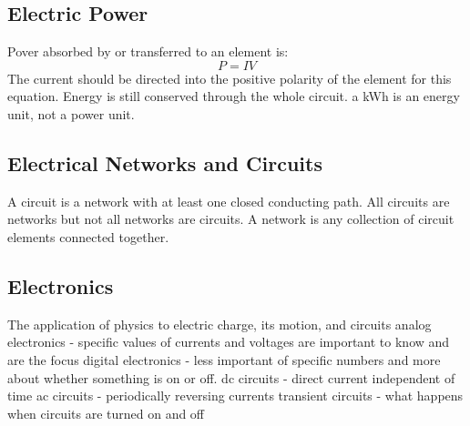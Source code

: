 \documentclass[twocolumn]{article}
\begin{document}
\subsection{Electric Power}
\begin{outline}
	\1 Pover absorbed by or transferred to an element is: \[P=IV\] The current should be directed into the positive polarity of the element for this equation. 
	\1 Energy is still conserved through the whole circuit. 
	\1 a kWh is an energy unit, not a power unit. 
\end{outline}
\subsection{Electrical Networks and Circuits}
\begin{outline}
	\1 A circuit is a network with at least one closed conducting path. 
	\1 All circuits are networks but not all networks are circuits. 
	\1 A network is any collection of circuit elements connected together. 
\end{outline}
\subsection{Electronics}
\begin{outline}
	\1 The application of physics to electric charge, its motion, and circuits
	\1 analog electronics - specific values of currents and voltages are important to know and are the focus
	\1 digital electronics - less important of specific numbers and more about whether something is on or off. 
	\1 dc circuits - direct current independent of time
	\1 ac circuits - periodically reversing currents
	\1 transient circuits - what happens when circuits are turned on and off 
\end{outline}
\end{document}

